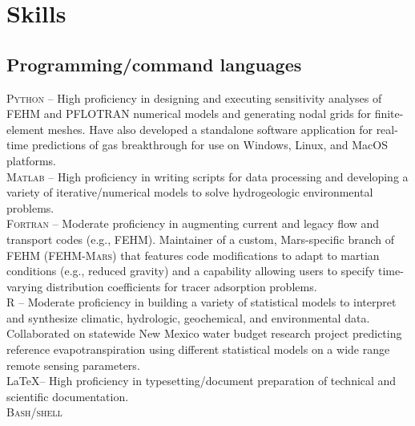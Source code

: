 \documentclass[11pt, letterpaper]{article}
\begin{document}
\section*{Skills}
\subsection*{Programming/command languages}
\noindent
\textsc{Python} – High proficiency in designing and executing sensitivity
analyses of FEHM and PFLOTRAN numerical models and generating nodal grids for
finite-element meshes. Have also developed a standalone software application
for real-time predictions of gas breakthrough for use on Windows, Linux, and
MacOS platforms.\\[5pt]
\textsc{Matlab} – High proficiency in writing scripts for data processing and
developing a variety of iterative/numerical models to solve hydrogeologic
environmental problems.\\[5pt]
\textsc{Fortran} – Moderate proficiency in augmenting current and legacy flow
and transport codes (e.g., \textsc{FEHM}). Maintainer of a custom, Mars-specific
branch of \textsc{FEHM} (\textsc{FEHM-Mars}) that features code modifications 
to adapt to martian conditions (e.g., reduced gravity) and a capability
allowing users to specify time-varying distribution coefficients for tracer
adsorption problems.\\[5pt]
\textsc{R} – Moderate proficiency in building a variety of statistical models
to interpret and synthesize climatic, hydrologic, geochemical, and
environmental data. Collaborated on statewide New Mexico water budget research
project predicting reference evapotranspiration using different statistical
models on a wide range remote sensing parameters.\\[5pt]
\LaTeX – High proficiency in typesetting/document preparation of technical and
scientific documentation. \\[5pt]
\textsc{Bash/shell}
\end{document}
